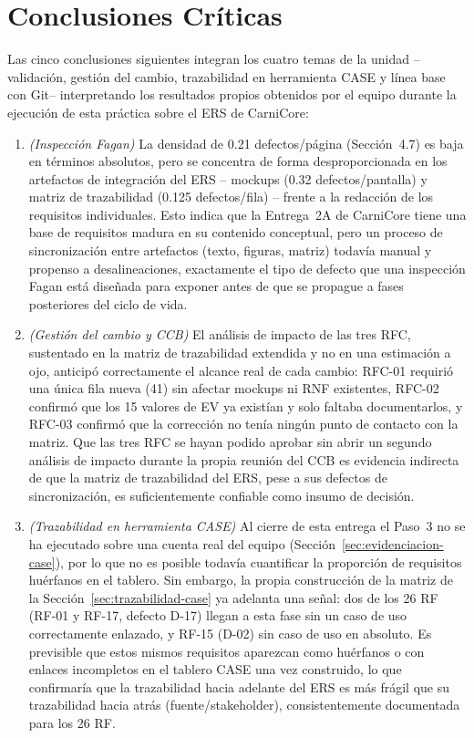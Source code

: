 \documentclass[11pt,a4paper]{article}
\begin{document}
\section{Conclusiones Críticas}
Las cinco conclusiones siguientes integran los cuatro temas de la unidad --validación, gestión del cambio, trazabilidad en herramienta CASE y línea base con Git-- interpretando los resultados propios obtenidos por el equipo durante la ejecución de esta práctica sobre el ERS de CarniCore:

\begin{enumerate}[nosep]
\item \textit{(Inspección Fagan)} La densidad de 0.21 defectos/página (Sección~4.7) es baja en términos absolutos, pero se concentra de forma desproporcionada en los artefactos de integración del ERS -- mockups (0.32 defectos/pantalla) y matriz de trazabilidad (0.125 defectos/fila) -- frente a la redacción de los requisitos individuales. Esto indica que la Entrega~2A de CarniCore tiene una base de requisitos madura en su contenido conceptual, pero un proceso de sincronización entre artefactos (texto, figuras, matriz) todavía manual y propenso a desalineaciones, exactamente el tipo de defecto que una inspección Fagan está diseñada para exponer antes de que se propague a fases posteriores del ciclo de vida.
\item \textit{(Gestión del cambio y CCB)} El análisis de impacto de las tres RFC, sustentado en la matriz de trazabilidad extendida y no en una estimación a ojo, anticipó correctamente el alcance real de cada cambio: RFC-01 requirió una única fila nueva (41) sin afectar mockups ni RNF existentes, RFC-02 confirmó que los 15 valores de EV ya existían y solo faltaba documentarlos, y RFC-03 confirmó que la corrección no tenía ningún punto de contacto con la matriz. Que las tres RFC se hayan podido aprobar sin abrir un segundo análisis de impacto durante la propia reunión del CCB es evidencia indirecta de que la matriz de trazabilidad del ERS, pese a sus defectos de sincronización, es suficientemente confiable como insumo de decisión.
\item \textit{(Trazabilidad en herramienta CASE)} Al cierre de esta entrega el Paso~3 no se ha ejecutado sobre una cuenta real del equipo (Sección~\ref{sec:evidenciacion-case}), por lo que no es posible todavía cuantificar la proporción de requisitos huérfanos en el tablero. Sin embargo, la propia construcción de la matriz de la Sección~\ref{sec:trazabilidad-case} ya adelanta una señal: dos de los 26 RF (RF-01 y RF-17, defecto D-17) llegan a esta fase sin un caso de uso correctamente enlazado, y RF-15 (D-02) sin caso de uso en absoluto. Es previsible que estos mismos requisitos aparezcan como huérfanos o con enlaces incompletos en el tablero CASE una vez construido, lo que confirmaría que la trazabilidad hacia adelante del ERS es más frágil que su trazabilidad hacia atrás (fuente/stakeholder), consistentemente documentada para los 26 RF.

\end{enumerate}
\end{document}
